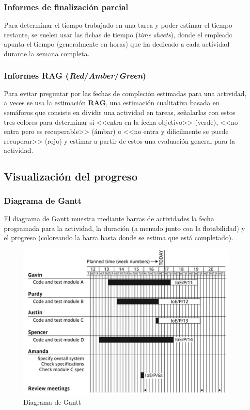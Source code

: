 \documentclass[12pt]{article}
\begin{document}
\subsubsection{Informes de finalización parcial}
\label{9.3.1}

{Para determinar el tiempo trabajado en una tarea y poder estimar el tiempo restante, se suelen usar las fichas de tiempo (\textit{time sheets}), donde el empleado apunta el tiempo (generalmente en horas) que ha dedicado a cada actividad durante la semana completa.}

\subsubsection{Informes RAG (\textit{Red}/\textit{Amber}/\textit{Green})}
\label{9.3.2}

{Para evitar preguntar por las fechas de compleción estimadas para una actividad, a veces se usa la estimación \textbf{RAG}, una estimación cualitativa basada en semáforos que consiste en dividir una actividad en tareas, señalarlas con estos tres colores para determinar si <<entra en la fecha objetivo>> (verde), <<no entra pero es recuperable>> (ámbar) o <<no entra y dificilmente se puede recuperar>> (rojo) y estimar a partir de estos una evaluación general para la actividad.}

\subsection{Visualización del progreso}
\label{9.4.0}

\subsubsection{Diagrama de Gantt}
\label{9.4.1}

{El diagrama de Gantt muestra mediante barras de actividades la fecha programada para la actividad, la duración (a menudo junto con la flotabilidad) y el progreso (coloreando la barra hasta donde se estima que está completado).}

\begin{figure} [ht]
    \centering
    \includegraphics[keepaspectratio=true, scale=0.75]{images/Gantt.png}
    \caption{Diagrama de Gantt}
    \label{fig:9.1}
\end{figure}
\end{document}
